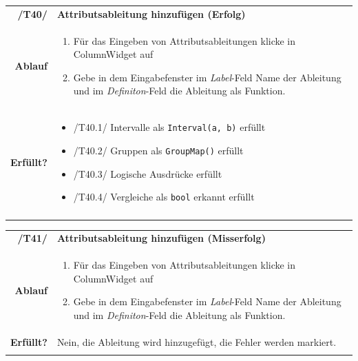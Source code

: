 \documentclass{article}
\newcommand{\guibutton}[1]{\fbox{\texttt{#1}}}
\begin{document}
\begin{table}[H]
\begin{tabularx}{\textwidth}{rX}
\vspace{1mm}
\textbf{/T40/}         & \textbf{Attributsableitung hinzufügen (Erfolg)} \\ \vspace{1mm}
\textbf{Ablauf} &
\begin{enumerate}
    \item Für das Eingeben von Attributsableitungen klicke in ColumnWidget auf \guibutton{+}
    \item Gebe in dem Eingabefenster im \textit{Label}-Feld Name der Ableitung und im \textit{Definiton}-Feld die Ableitung als Funktion.
\end{enumerate} \\ \vspace{1mm}
\textbf{Erfüllt?}  &  
\begin{itemize}
    \item /T40.1/ Intervalle als \texttt{Interval(a, b)} erfüllt
    \item /T40.2/ Gruppen als \texttt{GroupMap()} erfüllt
    \item /T40.3/ Logische Ausdrücke erfüllt
    \item /T40.4/ Vergleiche als \texttt{bool} erkannt erfüllt
\end{itemize}\\ \vspace{1mm}
\end{tabularx}
\end{table}

\begin{table}[H]
\begin{tabularx}{\textwidth}{rX}
\vspace{1mm}
\textbf{/T41/}         & \textbf{Attributsableitung hinzufügen (Misserfolg)} \\ \vspace{1mm}
\textbf{Ablauf} & 
\begin{enumerate}
        \item Für das Eingeben von Attributsableitungen klicke in ColumnWidget auf \guibutton{+}
        \item Gebe in dem Eingabefenster im \textit{Label}-Feld Name der Ableitung und im \textit{Definiton}-Feld die Ableitung als Funktion.
    \end{enumerate} \\ \vspace{1mm}
\textbf{Erfüllt?}  & Nein, die Ableitung wird hinzugefügt, die Fehler werden markiert.  \\ \vspace{1mm}
\end{tabularx}
\end{table}
\end{document}
